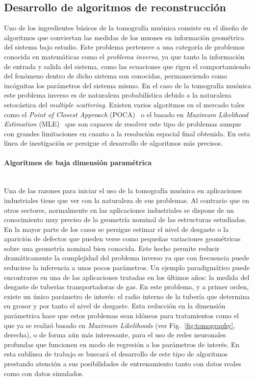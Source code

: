 \subsection{Desarrollo de algoritmos de reconstrucción}

Uno de los ingredientes básicos de la tomografía muónica consiste en el diseño de algoritmos que conviertan las medidas de los muones en información geométrica del sistema bajo estudio. Este problema pertenece a una categoría de problemas conocida en matemáticas como el \emph{problema inverso}, ya que tanto la información de entrada y salida del sistema, como las ecuaciones que rigen el comportamiendo del fenómeno dentro de dicho sistema son conocidas, permaneciendo como incógnitas los parámetros del sistema mismo. En el caso de la tomografía muónica este problema inverso es de naturaleza probabilística debido a la naturaleza estocástica del \emph{multiple scattering}. Existen varios algoritmos en el mercado tales como el \emph{Point of Closest Approach} (POCA)~\cite{bib:POCA} o el basado en \emph{Maximum Likelihood Estimation} (MLE)~\cite{bib:MLE} que son capaces de resolver este tipo de problemas aunque con grandes limitaciones en cuanto a la resolución espacial final obtenida. En esta línea de inestigación se persigue el desarrollo de algoritmos más precisos.  

\paragraph{Algoritmos de baja dimensión paramétrica\\\\}

Una de las razones para iniciar el uso de la tomografía muónica en aplicaciones industriales tiene que ver con la naturaleza de sus problemas. Al contrario que en otros sectores, normalmente en las aplicaciones industriales se dispone de un conocimiento muy preciso de la geometría nominal de las estructuras estudiadas. En la mayor parte de los casos se persigue estimar el nivel de desgaste o la aparición de defectos que pueden verse como pequeñas variaciones geométricas  sobre una geometría nominal bien conocida. Este hecho permite reducir dramáticamente la complejidad del problema inverso ya que con frecuencia puede reducirse la inferencia a unos pocos parámetros. Un ejemplo paradigmático puede encontrarse en una de las aplicaciones tratadas en los últimos años: la medida del desgaste de tuberías transportadoras de gas. En este problema, y a primer orden, existe un único parámetro de interés: el radio interno de la tubería que determina su grosor y por tanto el nivel de desgaste. Esta reducción en la dimensión parámetrica hace que estos problemas sean idóneos para tratamientos como el que ya se realizó basado en \emph{Maximum Likelihoods} (ver Fig.~\ref{fig:tomography}, derecha), o de forma aún más interesante, para el uso de redes neuronales profundas que funcionen en modo de regresión a los parámetros de interés. En esta sublínea de trabajo se buscará el desarrollo de este tipo de algoritmos prestando atención a sus posibilidades de entrenamiento tanto con datos reales como con datos simulados.

